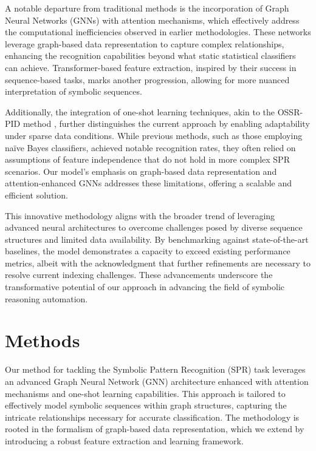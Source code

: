 \documentclass{article}
\begin{document}
A notable departure from traditional methods is the incorporation of Graph Neural Networks (GNNs) with attention mechanisms, which effectively address the computational inefficiencies observed in earlier methodologies. These networks leverage graph-based data representation to capture complex relationships, enhancing the recognition capabilities beyond what static statistical classifiers can achieve. Transformer-based feature extraction, inspired by their success in sequence-based tasks, marks another progression, allowing for more nuanced interpretation of symbolic sequences.

Additionally, the integration of one-shot learning techniques, akin to the OSSR-PID method \cite{arxiv:2109.03849v1}, further distinguishes the current approach by enabling adaptability under sparse data conditions. While previous methods, such as those employing naïve Bayes classifiers, achieved notable recognition rates, they often relied on assumptions of feature independence that do not hold in more complex SPR scenarios. Our model's emphasis on graph-based data representation and attention-enhanced GNNs addresses these limitations, offering a scalable and efficient solution.

This innovative methodology aligns with the broader trend of leveraging advanced neural architectures to overcome challenges posed by diverse sequence structures and limited data availability. By benchmarking against state-of-the-art baselines, the model demonstrates a capacity to exceed existing performance metrics, albeit with the acknowledgment that further refinements are necessary to resolve current indexing challenges. These advancements underscore the transformative potential of our approach in advancing the field of symbolic reasoning automation.

\section{Methods}
Our method for tackling the Symbolic Pattern Recognition (SPR) task leverages an advanced Graph Neural Network (GNN) architecture enhanced with attention mechanisms and one-shot learning capabilities. This approach is tailored to effectively model symbolic sequences within graph structures, capturing the intricate relationships necessary for accurate classification. The methodology is rooted in the formalism of graph-based data representation, which we extend by introducing a robust feature extraction and learning framework.
\end{document}
